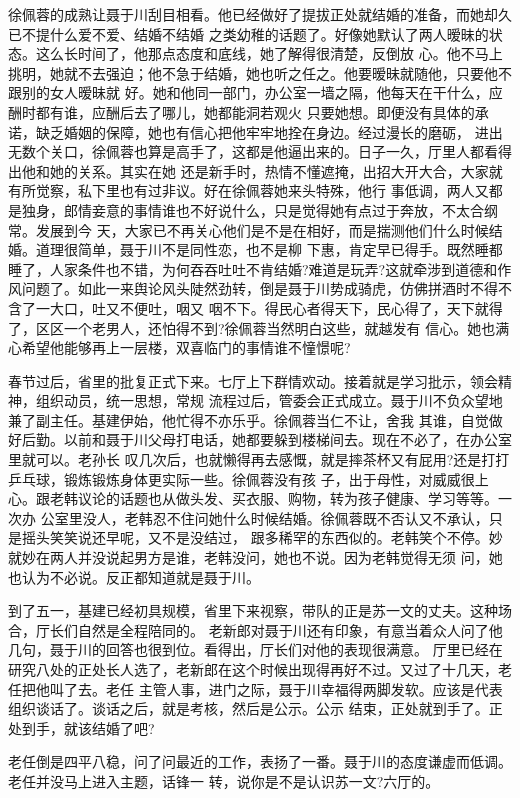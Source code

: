 \documentclass[11pt,a4paper,onecolumn]{article}
\begin{document}
徐佩蓉的成熟让聂于川刮目相看。他已经做好了提拔正处就结婚的准备，而她却久已不提什么爱不爱、结婚不结婚
之类幼稚的话题了。好像她默认了两人暧昧的状态。这么长时间了，他那点态度和底线，她了解得很清楚，反倒放
心。他不马上挑明，她就不去强迫；他不急于结婚，她也听之任之。他要暧昧就随他，只要他不跟别的女人暧昧就
好。她和他同一部门，办公室一墙之隔，他每天在干什么，应酬时都有谁，应酬后去了哪儿，她都能洞若观火
\myrule{}只要她想。即便没有具体的承诺，缺乏婚姻的保障，她也有信心把他牢牢地拴在身边。经过漫长的磨砺，
进出无数个关口，徐佩蓉也算是高手了，这都是他逼出来的。日子一久，厅里人都看得出他和她的关系。其实在她
还是新手时，热情不懂遮掩，出招大开大合，大家就有所觉察，私下里也有过非议。好在徐佩蓉她来头特殊，他行
事低调，两人又都是独身，郎情妾意的事情谁也不好说什么，只是觉得她有点过于奔放，不太合纲常。发展到今
天，大家已不再关心他们是不是在相好，而是揣测他们什么时候结婚。道理很简单，聂于川不是同性恋，也不是柳
下惠，肯定早已得手。既然睡都睡了，人家条件也不错，为何吞吞吐吐不肯结婚?难道是玩弄?这就牵涉到道德和作
风问题了。如此一来舆论风头陡然劲转，倒是聂于川势成骑虎，仿佛拼酒时不得不含了一大口，吐又不便吐，咽又
咽不下。得民心者得天下，民心得了，天下就得了，区区一个老男人，还怕得不到?徐佩蓉当然明白这些，就越发有
信心。她也满心希望他能够再上一层楼，双喜临门的事情谁不憧憬呢?

春节过后，省里的批复正式下来。七厅上下群情欢动。接着就是学习批示，领会精神，组织动员，统一思想，常规
流程过后，管委会正式成立。聂于川不负众望地兼了副主任。基建伊始，他忙得不亦乐乎。徐佩蓉当仁不让，舍我
其谁，自觉做好后勤。以前和聂于川父母打电话，她都要躲到楼梯间去。现在不必了，在办公室里就可以。老孙长
叹几次后，也就懒得再去感慨，就是摔茶杯又有屁用?还是打打乒乓球，锻炼锻炼身体更实际一些。徐佩蓉没有孩
子，出于母性，对威威很上心。跟老韩议论的话题也从做头发、买衣服、购物，转为孩子健康、学习等等。一次办
公室里没人，老韩忍不住问她什么时候结婚。徐佩蓉既不否认又不承认，只是摇头笑笑说还早呢，又不是没结过，
跟多稀罕的东西似的。老韩笑个不停。妙就妙在两人并没说起男方是谁，老韩没问，她也不说。因为老韩觉得无须
问，她也认为不必说。反正都知道就是聂于川。

到了五一，基建已经初具规模，省里下来视察，带队的正是苏一文的丈夫。这种场合，厅长们自然是全程陪同的。
老新郎对聂于川还有印象，有意当着众人问了他几句，聂于川的回答也很到位。看得出，厅长们对他的表现很满意。
厅里已经在研究八处的正处长人选了，老新郎在这个时候出现得再好不过。又过了十几天，老任把他叫了去。老任
主管人事，进门之际，聂于川幸福得两脚发软。应该是代表组织谈话了。谈话之后，就是考核，然后是公示。公示
结束，正处就到手了。正处到手，就该结婚了吧?

老任倒是四平八稳，问了问最近的工作，表扬了一番。聂于川的态度谦虚而低调。老任并没马上进入主题，话锋一
转，说你是不是认识苏一文?六厅的。
\end{document}
